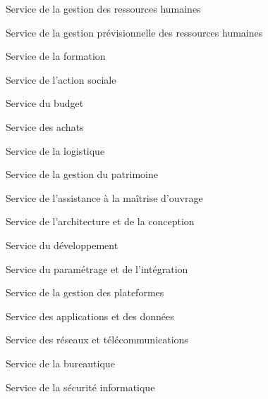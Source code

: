 \documentclass[a4paper,12pt,oneside]{report}
\begin{document}
{
\begin{svc}
\item Service de la gestion des ressources humaines
\item Service de la gestion prévisionnelle des ressources humaines
\item Service de la formation
\item Service de l'action sociale
\end{svc}
\begin{svc}
\item Service du budget
\item Service des achats
\item Service de la logistique
\item Service de la gestion du patrimoine
\end{svc}
\begin{svc}
\item Service de l'assistance à la maîtrise d'ouvrage
\item Service de l'architecture et de la conception
\item Service du développement
\item Service du paramétrage et de l'intégration
\end{svc}
\begin{svc}
\item Service de la gestion des plateformes
\item Service des applications et des données
\item Service des réseaux et télécommunications
\item Service de la bureautique
\item Service de la sécurité informatique
\end{svc}

}
\end{document}
